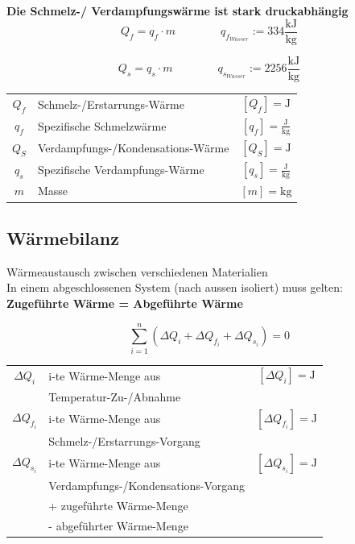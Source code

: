 \textbf{Die Schmelz-/ Verdampfungswärme ist stark druckabhängig} \\


$$ \boxed{ Q_f = q_f \cdot m } \qquad \qquad q_{f_{Wasser}} := 334 \mathrm{\frac{kJ}{kg}} $$

$$ \boxed{ Q_s = q_s \cdot m } \qquad \qquad q_{s_{Wasser}} := 2256 \mathrm{\frac{kJ}{kg} } $$



\begin{tabular}{c l c}

	$Q_f$ & Schmelz-/Erstarrungs-Wärme & $[Q_f] = \mathrm{J}$ \\
	\rule{0pt}{8pt}$q_f$ & Spezifische Schmelzwärme & $[q_f] = \mathrm{\frac{J}{kg}}$ \\
	$Q_S$ & Verdampfungs-/Kondensations-Wärme & $[Q_S] = \mathrm{J}$ \\
	\rule{0pt}{8pt}$q_s$ & Spezifische Verdampfungs-Wärme& $[q_s] = \mathrm{\frac{J}{kg}}$ \\
	$m$ & Masse & $[m] = \mathrm{kg}$ \\
\end{tabular}







\subsection{Wärmebilanz}
Wärmeaustausch zwischen verschiedenen Materialien \\

In einem abgeschlossenen System (nach aussen isoliert) muss gelten: \\
\textbf{Zugeführte Wärme = Abgeführte Wärme}

$$  \boxed{ \sum_{i=1}^n  ( \Delta Q_i + \Delta Q_{f_i} + \Delta Q_{s_i} ) = 0 } $$


\begin{tabular}{c l c}
	$\Delta Q_i$ & i-te Wärme-Menge aus & $[\Delta Q_i] = \mathrm{J}$ \\
				& Temperatur-Zu-/Abnahme & \\
	$\Delta Q_{f_i}$ & i-te Wärme-Menge aus  &  $[\Delta Q_{f_i}] = \mathrm{J}$ \\
				& Schmelz-/Erstarrungs-Vorgang  & \\
	$\Delta Q_{s_i}$ & i-te Wärme-Menge aus & $[\Delta Q_{s_i}] = \mathrm{J}$\\
					 & Verdampfungs-/Kondensations-Vorgang &  \\
	& +  zugeführte Wärme-Menge &  \\
	& - abgeführter Wärme-Menge & \\
\end{tabular}




